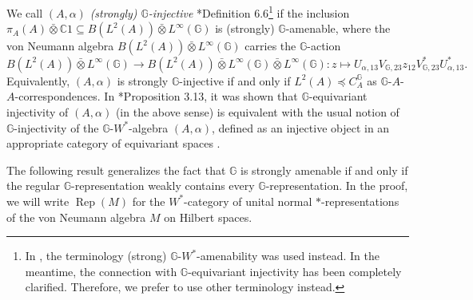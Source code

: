 \documentclass[reqno]{amsart}
\numberwithin{equation}{section}
\DeclareMathOperator{\Rep}{\mathrm{Rep}}
\newcommand{\C}{\mathbb{C}}
\newcommand{\G}{\mathbb{G}}
\newcommand{\ovot}{\bar{\otimes}}
\begin{document}
We call $(A, \alpha)$ \emph{(strongly) $\G$-injective} \cite{DCDR24}*{Definition 6.6}\footnote{In \cite{DCDR24}, the terminology (strong) $\G$-$W^*$-amenability was used instead. In the meantime, the connection with $\G$-equivariant injectivity has been completely clarified. Therefore, we prefer to use other terminology instead.} if the inclusion $\pi_A(A) \ovot \C1 \subseteq B(L^2(A))\ovot L^\infty(\G)$ is (strongly) $\G$-amenable, where the von Neumann algebra $B(L^2(A)) \ovot L^\infty(\G)$ carries the $\G$-action
$$B(L^2(A))\ovot L^\infty(\G)\to B(L^2(A))\ovot L^\infty(\G)\ovot L^\infty(\G): z \mapsto U_{\alpha,13}V_{\G,23}z_{12}V_{\G,23}^* U_{\alpha,13}^*.$$ Equivalently, $(A, \alpha)$ is strongly $\G$-injective if and only if $L^2(A)\preccurlyeq C_A^\G$ as $\G$-$A$-$A$-correspondences. In \cite{DR26}*{Proposition 3.13}, it was shown that $\G$-equivariant injectivity of $(A, \alpha)$ (in the above sense) is equivalent with the usual notion of $\G$-injectivity of the $\G$-$W^*$-algebra $(A, \alpha)$, defined as an injective object in an appropriate category of equivariant spaces \cites{Cr17, DH24, DR26}.

The following result generalizes the fact that $\G$ is strongly amenable if and only if the regular $\G$-representation weakly contains every $\G$-representation. In the proof, we will write $\Rep(M)$ for the $W^*$-category of unital normal $*$-representations of the von Neumann algebra $M$ on Hilbert spaces. 
\end{document}
